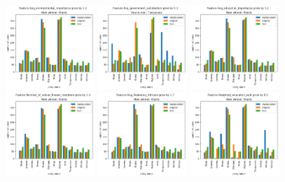 \documentclass[12pt]{article}
\begin{document}
\begin{figure}[ht]
		\centering
		\includegraphics[width=0.3\textwidth]{dramatic_feature/Avg_environmental_importance_increased}
		\includegraphics[width=0.3\textwidth]{dramatic_feature/Avg_government_satisfaction_increased}
		\includegraphics[width=0.3\textwidth]{dramatic_feature/Avg_education_importance_increased}
		\includegraphics[width=0.3\textwidth]{dramatic_feature/Number_of_valued_Kneset_members_increased}
		\includegraphics[width=0.3\textwidth]{dramatic_feature/Avg_Residancy_Altitude_increased}
		\includegraphics[width=0.3\textwidth]{dramatic_feature/Weighted_education_rank_increased}

\end{figure}
\end{document}

